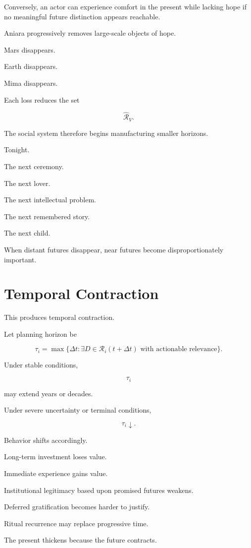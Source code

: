 \documentclass[11pt,oneside]{book}
\theoremstyle{definition}
\theoremstyle{remark}
\newcommand{\R}{\mathcal{R}}
\begin{document}
Conversely, an actor can experience comfort in the present while lacking hope if no meaningful future distinction appears reachable.

Aniara progressively removes large-scale objects of hope.

Mars disappears.

Earth disappears.

Mima disappears.

Each loss reduces the set

\[
\widehat{\R}_V.
\]

The social system therefore begins manufacturing smaller horizons.

Tonight.

The next ceremony.

The next lover.

The next intellectual problem.

The next remembered story.

The next child.

When distant futures disappear, near futures become disproportionately important.

\section{Temporal Contraction}

This produces temporal contraction.

Let planning horizon be

\[
\tau_i
=
\max
\{
\Delta t:
\exists D\in\R_i(t+\Delta t)
\text{ with actionable relevance}
\}.
\]

Under stable conditions,

\[
\tau_i
\]

may extend years or decades.

Under severe uncertainty or terminal conditions,

\[
\tau_i\downarrow.
\]

Behavior shifts accordingly.

Long-term investment loses value.

Immediate experience gains value.

Institutional legitimacy based upon promised futures weakens.

Deferred gratification becomes harder to justify.

Ritual recurrence may replace progressive time.

The present thickens because the future contracts.
\end{document}
